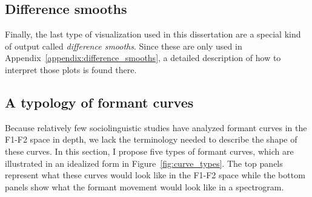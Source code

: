 \subsection{Difference smooths}

Finally, the last type of visualization used in this dissertation are a special kind of output called \textit{difference smooths}. Since these are only used in Appendix~\ref{appendix:difference_smooths}, a detailed description of how to interpret those plots is found there.

\subsection{A typology of formant curves}

Because relatively few sociolinguistic studies have analyzed formant curves in the F1-F2 space in depth, we lack the terminology needed to describe the shape of these curves. In this section, I propose five types of formant curves, which are illustrated in an idealized form in Figure~\ref{fig:curve_types}. The top panels represent what these curves would look like in the F1-F2 space while the bottom panels show what the formant movement would look like in a spectrogram.

